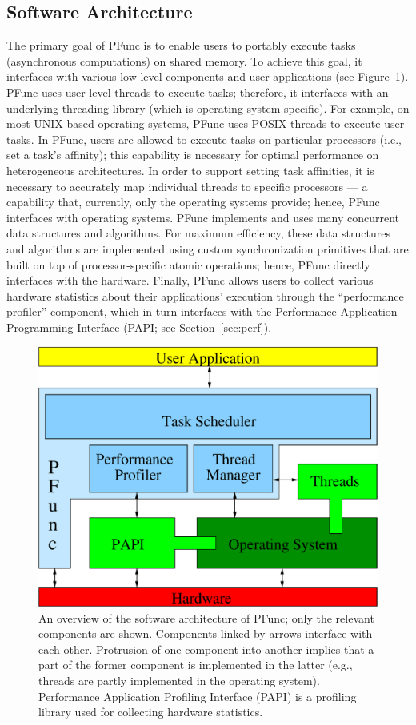 \subsection{Software Architecture}
\label{subsec:software_architecture}

The primary goal of PFunc is to enable users to portably execute tasks
(asynchronous computations) on shared memory.
%
To achieve this goal, it interfaces with various low-level components and
user applications (see Figure~\ref{fig:software_architecture}).
%
PFunc uses user-level threads to execute tasks; therefore, it interfaces with
an underlying threading library (which is operating system specific). 
%
For example, on most UNIX-based operating systems, PFunc uses POSIX threads to
execute user tasks.
%
In PFunc, users are allowed to execute tasks on particular processors (i.e.,
set a task's affinity); this capability is necessary for optimal performance on
heterogeneous architectures.
%
In order to support setting task affinities, it is necessary to accurately map
individual threads to specific processors --- a capability that, currently,
only the operating systems provide; hence, PFunc interfaces with operating
systems.
%
PFunc implements and uses many concurrent data structures and algorithms. 
%
For maximum efficiency, these data structures and algorithms are implemented
using custom synchronization primitives that are built on top of
processor-specific atomic operations; hence, PFunc directly interfaces with the
hardware.
%
Finally, PFunc allows users to collect various hardware statistics about their
applications' execution  through the ``performance profiler'' component, which
in turn interfaces with the Performance Application Programming Interface
(PAPI; see Section~\ref{sec:perf}).

\begin{figure}
\centering
\includegraphics[width=.8\textwidth]{figs/architecture}
\caption{An overview of the software architecture of PFunc; only the relevant
components are shown. Components linked by arrows interface with each other.
Protrusion of one component into another implies that a part of the former
component is implemented in the latter (e.g., threads are partly implemented in
the operating system). Performance Application Profiling Interface (PAPI) is a
profiling library used for collecting hardware statistics.}
\label{fig:software_architecture}
\end{figure}

